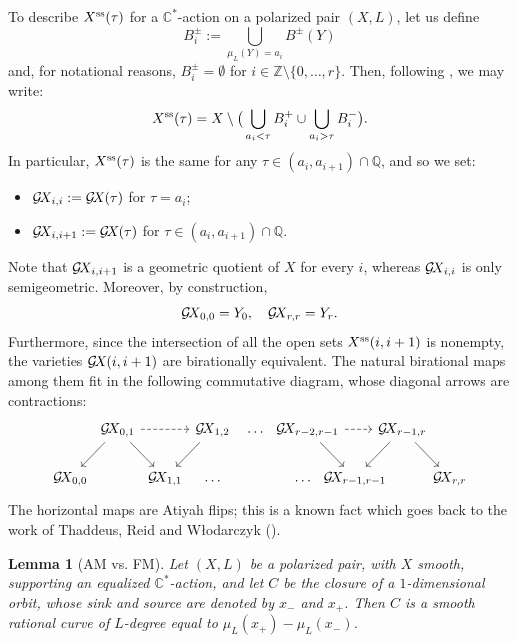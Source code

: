 \documentclass[10pt,a4paper]{article}
\numberwithin{equation}{section}
\newtheorem{lemma}[theorem]{Lemma}
\theoremstyle{definition}
\theoremstyle{remark}
\def\C{{\mathbb C}}
\def\Q{{\mathbb Q}}
\def\Z{{\mathbb Z}}
\def\Q{{\mathbb{Q}}}
\def\operatorname#1{\mathop{\rm #1}\nolimits}
\def\GX{\mathcal{G}\!X\hspace{-0.5pt}}
\def\ss{\operatorname{ss}}
\begin{document}
To describe $X^{\ss}(\tau)$ for a $\C^*$-action on a polarized pair $(X,L)$, let us define
$$B^\pm_i:=\bigcup_{\mu_L(Y)=a_i}B^\pm(Y)$$
and, for notational reasons, $B^\pm_i=\emptyset$ for $i\in \Z\setminus\{0,\dots,r\}$. Then,
following \cite{wors6-BBS}, we may write:
\[
X^{\ss}(\tau)=X\setminus \big(\bigcup_{a_i<\tau}B^+_i\cup \bigcup_{a_i>\tau}B^{-}_i\big).
\]
In particular, $X^{\ss}(\tau)$ is the same for any  $\tau\in (a_i,a_{i+1})\cap \Q$, and so we set:
\begin{itemize}[itemsep=5pt,topsep=5pt]
\item $\GX_{i,i}:=\GX(\tau)$ for $\tau=a_i$; 
\item $\GX_{i,i+1}:=\GX(\tau)$ for $\tau\in(a_i,a_{i+1})\cap \Q$.
\end{itemize}
Note that $\GX_{i,i+1}$ is a geometric quotient of $X$ for every $i$, whereas $\GX_{i,i}$ is only semigeometric.  
Moreover, by construction, $$\GX_{0,0}=Y_0,\quad \GX_{r,r}=Y_r.$$ 
Furthermore, since the intersection of all the open sets $X^{\ss}(i,i+1)$ is nonempty, the varieties $\GX(i,i+1)$ are birationally equivalent. The natural birational maps among them fit in the following commutative diagram, whose diagonal arrows are contractions:
\begin{equation}
\begin{tikzcd}[
  column sep={3.4em,between origins},
  row sep={3.5em,between origins},
]
&\GX_{0,1} \arrow[rr,dashed] \arrow[rd] \arrow[dl]&&\GX_{1,2} \arrow[dl]&\dots\ \ &\GX_{r-2,r-1} \arrow[rr,dashed] \arrow[rd] &&\GX_{r-1,r}\arrow[rd] \arrow[dl]&\\
\GX_{0,0}&&\GX_{1,1}&\dots&&\dots\ \ &\GX_{r-1,r-1}&&\GX_{r,r}
\end{tikzcd}
\label{wors6:eq:GITquot}
\end{equation}
The horizontal maps are Atiyah flips; this is a known fact which goes back to the work of Thaddeus, Reid and W{\l}odarczyk (\cite{wors6-Wlodarczyk2009,wors6-Thaddeus1996,wors6-ReidFlip}).

\begin{lemma}[AM vs. FM]\label{wors6:lem:AMFM}
Let $(X,L)$ be a polarized pair, with $X$ smooth, supporting an equalized $\C^*$-action, and let $C$ be the closure of a $1$-dimensional orbit, whose sink and source are denoted by $x_-$ and $x_+$. Then $C$ is a smooth rational curve of $L$-degree  equal to $\mu_L(x_+)-\mu_L(x_-)$.
\end{lemma} 

\setcounter{section}{4}\setcounter{theorem}{0}
\end{document}

